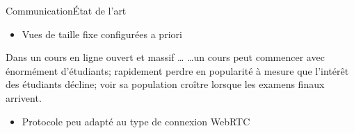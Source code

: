 \begin{frame}{Communication}{État de l'art}

  
  \begin{itemize}
  \item Vues de taille fixe configurées a priori 
  \end{itemize}
  
  \begin{exampleblock}{Dans un cours en ligne ouvert et massif \ldots}
    \ldots un cours peut commencer avec énormément d'étudiants; rapidement
    perdre en popularité à mesure que l'intérêt des étudiants décline; voir sa
    population croître lorsque les examens finaux arrivent.
  \end{exampleblock}
  
  \vspace{0.5cm}

  \begin{itemize}
  \item Protocole peu adapté au type de connexion WebRTC
  \end{itemize}
  \begin{center}
    
  \end{center}





\end{frame}



